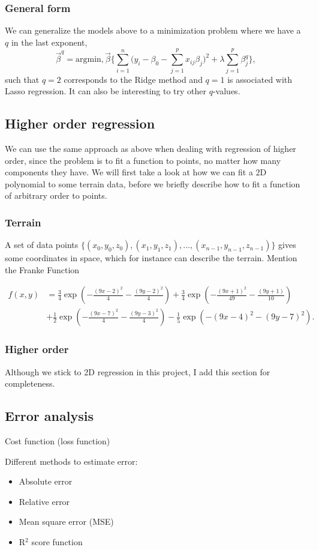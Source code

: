 \subsubsection{General form}
We can generalize the models above to a minimization problem where we have a $q$ in the last exponent, 
\begin{equation}
\vec{\beta}^q=\text{argmin},\vec{\beta}\bigg\{\sum_{i=1}^{n}\Big(y_i-\beta_0-\sum_{j=1}^px_{ij}\beta_j\Big)^2+\lambda\sum_{j=1}^p\beta_j^q\bigg\},
\end{equation}
such that $q=2$ corresponds to the Ridge method and $q=1$ is associated with Lasso regression. It can also be interesting to try other $q$-values.

\subsection{Higher order regression} \label{sec:higher_reg}
We can use the same approach as above when dealing with regression of higher order, since the problem is to fit a function to points, no matter how many components they have. We will first take a look at how we can fit a 2D polynomial to some terrain data, before we briefly describe how to fit a function of arbitrary order to points.

\subsubsection{Terrain} \label{sec:terrain}
A set of data points $\{(x_0, y_0, z_0), (x_1, y_1, z_1),\hdots, (x_{n-1}, y_{n-1},z_{n-1})\}$ gives some coordinates in space, which for instance can describe the terrain. 
Mention the Franke Function 

\begin{align*}
f(x,y) &= \frac{3}{4}\exp{\left(-\frac{(9x-2)^2}{4} - \frac{(9y-2)^2}{4}\right)}+\frac{3}{4}\exp{\left(-\frac{(9x+1)^2}{49}- \frac{(9y+1)}{10}\right)} \\
&+\frac{1}{2}\exp{\left(-\frac{(9x-7)^2}{4} - \frac{(9y-3)^2}{4}\right)} -\frac{1}{5}\exp{\left(-(9x-4)^2 - (9y-7)^2\right) }.
\end{align*}


\subsubsection{Higher order}
Although we stick to 2D regression in this project, I add this section for completeness. 


\subsection{Error analysis}

Cost function (loss function) 

Different methods to estimate error:
\begin{itemize}
\item{Absolute error}
\item{Relative error}
\item{Mean square error (MSE)}
\item{R$^2$ score function}
\end{itemize}

